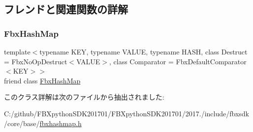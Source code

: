 \subsection{フレンドと関連関数の詳解}
\mbox{\label{class_fbx_hash_map_1_1_iterator_a58c051a31d06809f29f78fa92219181c}} 
\subsubsection{\texorpdfstring{Fbx\+Hash\+Map}{FbxHashMap}}
{\footnotesize\ttfamily template$<$typename K\+EY, typename V\+A\+L\+UE, typename H\+A\+SH, class Destruct = Fbx\+No\+Op\+Destruct$<$\+V\+A\+L\+U\+E$>$, class Comparator = Fbx\+Default\+Comparator$<$\+K\+E\+Y$>$$>$ \\
friend class \hyperlink{class_fbx_hash_map}{Fbx\+Hash\+Map}\hspace{0.3cm}{\ttfamily [friend]}}



このクラス詳解は次のファイルから抽出されました\+:\begin{DoxyCompactItemize}
\item 
C\+:/github/\+F\+B\+Xpython\+S\+D\+K201701/\+F\+B\+Xpython\+S\+D\+K201701/2017./include/fbxsdk/core/base/\hyperlink{fbxhashmap_8h}{fbxhashmap.\+h}\end{DoxyCompactItemize}
